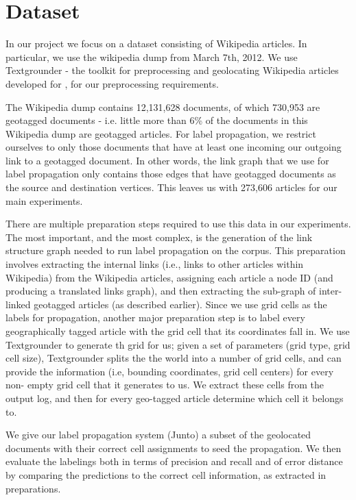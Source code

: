 \section{Dataset} 
\par In our project we focus on a dataset consisting of
Wikipedia articles. In particular, we use the wikipedia dump from March
7th, 2012. We use Textgrounder - the toolkit for preprocessing and geolocating
Wikipedia articles developed for \cite{wing-baldridge:11}, for our
preprocessing requirements.

\par The Wikipedia dump contains 12,131,628 documents,  of which 730,953 are geotagged documents -
i.e. little more than 6\% of the documents in this Wikipedia dump are
geotagged articles.  For label propagation, we restrict ourselves to only
those documents that have at least one incoming our outgoing link to a
geotagged document. In other words, the link graph that we use for label
propagation only contains those edges that have geotagged documents as the
source and destination vertices. This leaves us with 273,606 articles for our
main experiments.

\par There are multiple preparation steps required to use this data in our
experiments. The most important, and the most complex, is the generation of
the  link structure graph needed to run label propagation on the corpus. This
preparation involves extracting the internal links (i.e., links to other
articles within Wikipedia)  from the Wikipedia articles, assigning each
article a node ID (and producing a translated links  graph), and then
extracting the sub-graph of inter-linked geotagged articles (as  described
earlier). Since we use grid cells as the labels for propagation,  another
major preparation step is to label every geographically tagged article  with
the grid cell that its coordinates fall in. We use Textgrounder to generate th
grid for us;  given a set of parameters (grid type, grid cell size),
Textgrounder splits the the world into a number of grid cells, and can provide
the information (i.e, bounding coordinates, grid cell centers) for every  non-
empty grid cell that it generates to us. We extract these cells from the
output  log, and then for every geo-tagged article determine which cell it
belongs to.

\par 
We give our label propagation system (Junto) a subset of the geolocated
documents with their correct cell assignments to seed the propagation. We then
evaluate the labelings both in terms of precision and recall and of error
distance by comparing the predictions to the correct cell information, as
extracted in preparations.

